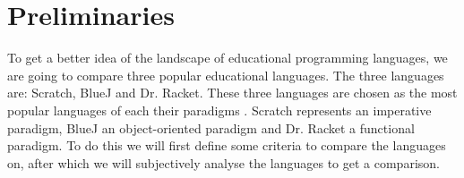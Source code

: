 \chapter{Preliminaries}
\label{chap:preliminaries}
To get a better idea of the landscape of educational programming languages, we are going to compare three popular educational languages.
The three languages are: Scratch, BlueJ and Dr. Racket.
These three languages are chosen as the most popular languages of each their paradigms .
Scratch represents an imperative paradigm, BlueJ an object-oriented paradigm and Dr. Racket a functional paradigm.
To do this we will first define some criteria to compare the languages on, after which we will subjectively analyse the languages to get a comparison.